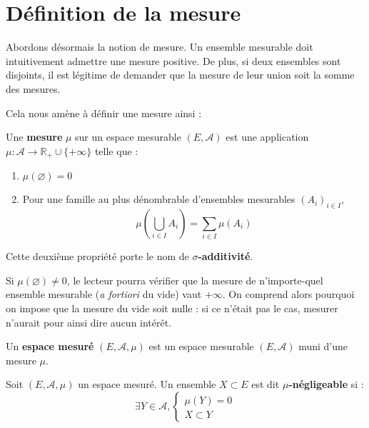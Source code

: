 \documentclass[../integ-proba.tex]{subfiles}
\begin{document}
\section{Définition de la mesure}

Abordons désormais la notion de mesure.
Un ensemble mesurable doit intuitivement admettre une mesure positive.
De plus, si deux ensembles sont disjoints, il est légitime de demander que la mesure de leur union soit la somme des mesures.

Cela nous amène à définir une mesure ainsi :

\begin{defi}
  Une \textbf{mesure} $\mu$ sur un espace mesurable $(E, \mathcal{A})$ est une application $\mu : \mathcal{A} \longrightarrow \mathbb{R}_+ \cup \{ +\infty \}$ telle que :
  \begin{enumerate}
    \item $\mu(\varnothing) = 0$
    \item Pour une famille au plus dénombrable d'ensembles mesurables $\left(A_i\right)_{i \in I}$,
    $$\mu\left(\bigcup_{i \in I}A_i\right) = \sum_{i \in I} \mu\left(A_i\right)$$
  \end{enumerate}
\end{defi}

\begin{rem}
  Cette deuxième propriété porte le nom de $\sigma$\textbf{-additivité}.
\end{rem}

\begin{rem}
  Si $\mu(\varnothing) \neq 0$, le lecteur pourra vérifier que la mesure de n'importe-quel ensemble mesurable (\textit{a fortiori} du vide) vaut $+\infty$.
  On comprend alors pourquoi on impose que la mesure du vide soit nulle : si ce n'était pas le cas, mesurer n'aurait pour ainsi dire aucun intérêt.
\end{rem}

\begin{defi}
  Un \textbf{espace mesuré} $\left(E, \mathcal{A}, \mu\right)$ est un espace mesurable $\left(E, \mathcal{A}\right)$ muni d'une mesure $\mu$.
\end{defi}

\begin{defi}
  Soit $\left(E, \mathcal{A}, \mu\right)$ un espace mesuré.
  Un ensemble $X \subset E$ est dit $\mu$\textbf{-négligeable} si :
  $$\exists Y \in \mathcal{A}, 
  \left\{
    \begin{array}{c}
      \mu(Y)=0\\
      X \subset Y
    \end{array}
    \right.$$
\end{defi}
\end{document}

